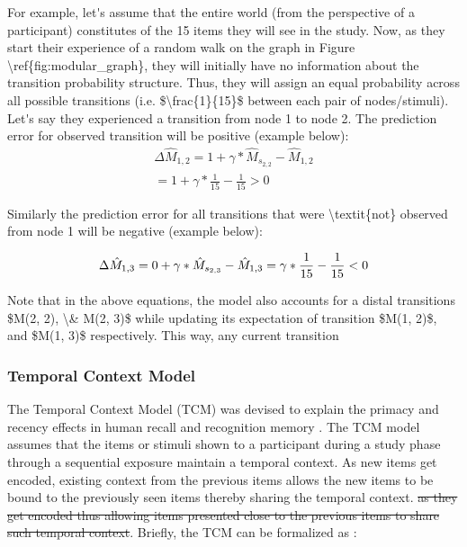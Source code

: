 \ac{For example, let's assume that the entire world (from the perspective of a participant) constitutes of the 15 items they will see in the study. Now, as they start their experience of a random walk on the graph in Figure \ref{fig:modular_graph}, they will initially have no information about the transition probability structure. Thus, they will assign an equal probability across all possible transitions (i.e. $\frac{1}{15}$ between each pair of nodes/stimuli). Let's say they experienced a transition from node 1 to node 2. The prediction error for observed transition will be positive (example below)}:
\begin{equation}
	\begin{aligned}
		\Delta\hat{M}_{1,2} = 1 + \gamma*\hat{M}_{s_{2, 2}} - \hat{M}_{1,2} \\
		 = 1 + \gamma*\frac{1}{15} - \frac{1}{15} > 0
	\end{aligned}
\end{equation}

\ac{Similarly the prediction error for all transitions that were \textit{not} observed from node 1 will be negative (example below)}:

\begin{equation}
	\Delta\hat{M}_{1,3} = 0 + \gamma*\hat{M}_{s_{2, 3}} - \hat{M}_{1,3} \\
		= \gamma*\frac{1}{15} - \frac{1}{15} < 0
\end{equation}

\ac{Note that in the above equations, the model also accounts for a distal transitions $M(2, 2), \& M(2, 3)$ while updating its expectation of transition $M(1, 2)$, and $M(1, 3)$ respectively. This way, any current transition}


\subsubsection*{Temporal Context Model}
The Temporal Context Model (TCM) was devised to explain the primacy and recency effects in human recall and recognition memory \cite{howard2005temporal}. \ac{The TCM model assumes that the items or stimuli shown to a participant during a study phase through a sequential exposure maintain a temporal context. As new items get encoded, existing context from the previous items allows the new items to be bound to the previously seen items thereby sharing the temporal context}. \st{as they get encoded thus allowing items presented close to the previous items to share such temporal context}. Briefly, the TCM can be formalized as \cite{gershman2012successor}:

